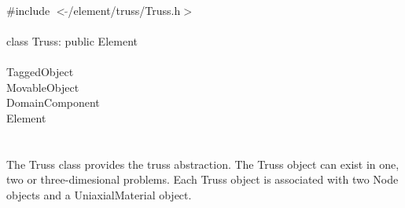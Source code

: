 
   \\
\indent \#include $<\tilde{ }$/element/truss/Truss.h$>$  \\

  \\
\indent class Truss: public Element \\

 \\
\indent TaggedObject \\
\indent MovableObject \\
\indent\indent DomainComponent \\
\indent\indent\indent Element \\
\indent\indent\indent{} \\

  \\
\indent The Truss class provides the truss abstraction. The Truss
object can exist in one, two or three-dimesional problems. Each Truss
object is associated with two Node objects and a UniaxialMaterial
object. \\ 

